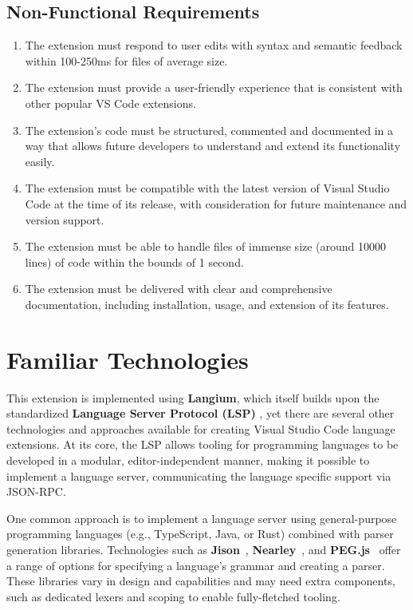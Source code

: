 \begin{multicols}{2}
  \subsection*{Non-Functional Requirements}
  \begin{enumerate}
    \item The extension must respond to user edits with syntax and semantic feedback within 100-250ms for files of average size.
    \item The extension must provide a user-friendly experience that is consistent with other popular VS Code extensions.
    \item The extension's code must be structured, commented and documented in a way that allows future developers to understand and extend its functionality easily.
    \item The extension must be compatible with the latest version of Visual Studio Code at the time of its release, with consideration for future maintenance and version support.
    \item The extension must be able to handle files of immense size (around 10000 lines) of code within the bounds of 1 second.
    \item The extension must be delivered with clear and comprehensive documentation, including installation, usage, and extension of its features.
  \end{enumerate}
\end{multicols}

\section{Familiar Technologies}

This extension is implemented using \textbf{Langium}, which itself builds upon the standardized \textbf{Language Server Protocol (LSP)} \cite{LSP}, yet
there are several other technologies and approaches available for creating Visual Studio Code language extensions. At its core, the LSP allows tooling for programming
languages to be developed in a modular, editor-independent manner, making it possible to implement a language server, communicating the
language specific support via JSON-RPC.

One common approach is to implement a language server using general-purpose programming languages (e.g., TypeScript, Java, or Rust) combined with parser generation libraries.
Technologies such as \textbf{Jison}~\cite{Jison}, \textbf{Nearley}~\cite{Nearley}, and \textbf{PEG.js}~\cite{PEGjs} offer a range of options for specifying a language's grammar
and creating a parser. These libraries vary in design and capabilities and may need extra components, such as dedicated lexers and scoping to enable fully-fletched tooling.

